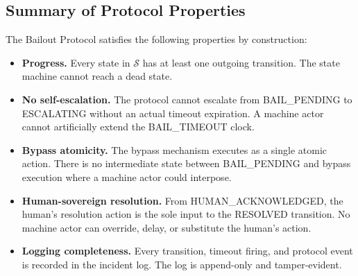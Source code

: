 \subsection{Summary of Protocol Properties}

The Bailout Protocol satisfies the following properties by construction:

\begin{itemize}
  \item \textbf{Progress.} Every state in $\mathcal{S}$ has at least one outgoing transition. The state machine cannot reach a dead state.
  \item \textbf{No self-escalation.} The protocol cannot escalate from BAIL\_PENDING to ESCALATING without an actual timeout expiration. A machine actor cannot artificially extend the BAIL\_TIMEOUT clock.
  \item \textbf{Bypass atomicity.} The bypass mechanism executes as a single atomic action. There is no intermediate state between BAIL\_PENDING and bypass execution where a machine actor could interpose.
  \item \textbf{Human-sovereign resolution.} From HUMAN\_ACKNOWLEDGED, the human's resolution action is the sole input to the RESOLVED transition. No machine actor can override, delay, or substitute the human's action.
  \item \textbf{Logging completeness.} Every transition, timeout firing, and protocol event is recorded in the incident log. The log is append-only and tamper-evident.
\end{itemize}
